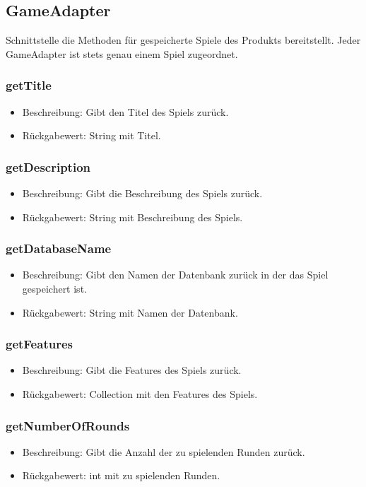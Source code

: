 \documentclass[a4paper]{scrreprt}
\begin{document}
	\subsection{GameAdapter}
	Schnittstelle die Methoden für gespeicherte Spiele des Produkts bereitstellt.
	Jeder GameAdapter ist stets genau einem Spiel zugeordnet.
	
	\subsubsection{getTitle}
	\begin{itemize}
		\item Beschreibung: Gibt den Titel des Spiels zurück.
		\item Rückgabewert: String mit Titel.
	\end{itemize}
	
	\subsubsection{getDescription}
	\begin{itemize}
		\item Beschreibung: Gibt die Beschreibung des Spiels zurück.
		\item Rückgabewert: String mit Beschreibung des Spiels.
	\end{itemize}
	
	\subsubsection{getDatabaseName}
	\begin{itemize}
		\item Beschreibung: Gibt den Namen der Datenbank zurück in der das Spiel gespeichert ist.
		\item Rückgabewert: String mit Namen der Datenbank.
	\end{itemize}
	
	\subsubsection{getFeatures}
	\begin{itemize}
		\item Beschreibung: Gibt die Features des Spiels zurück.
		\item Rückgabewert: Collection mit den Features des Spiels.
	\end{itemize}
	
	\subsubsection{getNumberOfRounds}
	\begin{itemize}
		\item Beschreibung: Gibt die Anzahl der zu spielenden Runden zurück.
		\item Rückgabewert: int mit zu spielenden Runden.
	\end{itemize}
	
\end{document}
